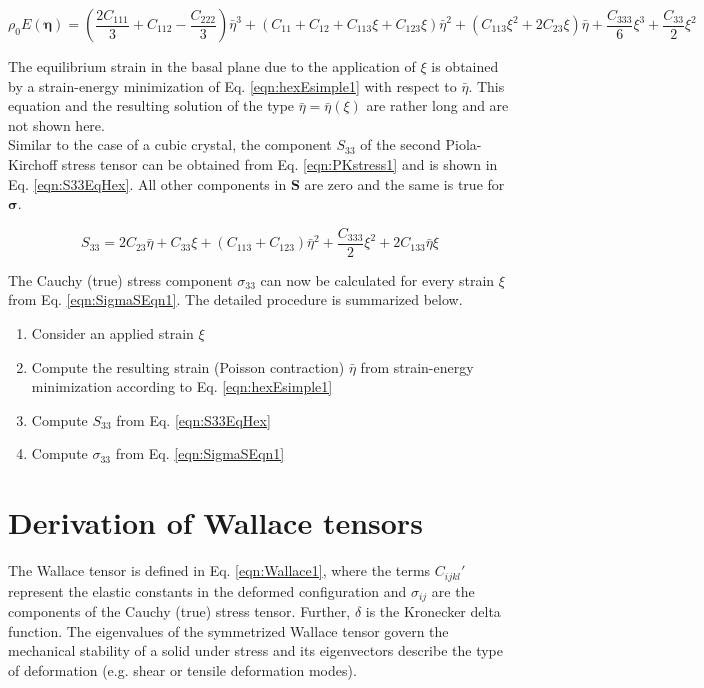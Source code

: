 \documentclass[showpacs,aps,floatfix,prb,reprint,superscriptaddress,onecolumn]{revtex4-1}
\begin{document}
\begin{enumerate}
\begin{equation}
\label{eqn:hexEsimple1} 
\rho_{0} E \left(\bm{\eta}\right) = \left(\frac{2 C_{111}}{3} + C_{112} - \frac{C_{222}}{3}\right)\bar{\eta}^{3} + \left(C_{11} + C_{12} + C_{113} \xi + C_{123} \xi \right) \bar{\eta}^{2} + \left(C_{113} \xi^{2} + 2 C_{23} \xi  \right) \bar{\eta} +  \frac{C_{333}}{6}\xi^{3} + \frac{C_{33}}{2} \xi^{2}
\end{equation}

The equilibrium strain in the basal plane due to the application of $\xi$ is obtained by a strain-energy minimization of Eq. \ref{eqn:hexEsimple1} with respect to $\bar{\eta}$. This equation and the resulting solution of the type $\bar{\eta} = \bar{\eta}\left(\xi \right)$ are rather long and are not shown here. \\

Similar to the case of a cubic crystal, the component $S_{33}$ of the second Piola-Kirchoff stress tensor can be obtained from Eq. \ref{eqn:PKstress1} and is shown in Eq. \ref{eqn:S33EqHex}. All other components in $\mathbf{S}$ are zero and the same is true for $\mathbf{\sigma}$.

\begin{equation}
\label{eqn:S33EqHex} 
S_{33} = 2 C_{23} \bar{\eta} + C_{33} \xi + \left(C_{113}+C_{123}\right) \bar{\eta}^{2} + \frac{C_{333}}{2}\xi^{2} + 2 C_{133} \bar{\eta} \xi
\end{equation}

The Cauchy (true) stress component $\sigma_{33}$ can now be calculated for every strain $\xi$ from Eq. \ref{eqn:SigmaSEqn1}. The detailed procedure is summarized below.

\newpage

\begin{enumerate}
\item Consider an applied strain $\xi$
\item Compute the resulting strain (Poisson contraction) $\bar{\eta}$ from strain-energy minimization according to Eq. \ref{eqn:hexEsimple1}
\item Compute $S_{33}$ from Eq. \ref{eqn:S33EqHex}
\item Compute $\sigma_{33}$ from Eq. \ref{eqn:SigmaSEqn1}
\end{enumerate}


\section{Derivation of Wallace tensors}
The Wallace tensor is defined in Eq. \ref{eqn:Wallace1}, where the terms $C_{ijkl}'$ represent the elastic constants in the deformed configuration and $\sigma_{ij}$ are the components of the Cauchy (true) stress tensor. Further, $\delta$ is the Kronecker delta function. The eigenvalues of the symmetrized Wallace tensor govern the mechanical stability of a solid under stress and its eigenvectors describe the type of deformation (e.g. shear or tensile deformation modes). \\


\end{enumerate}
\end{document}
